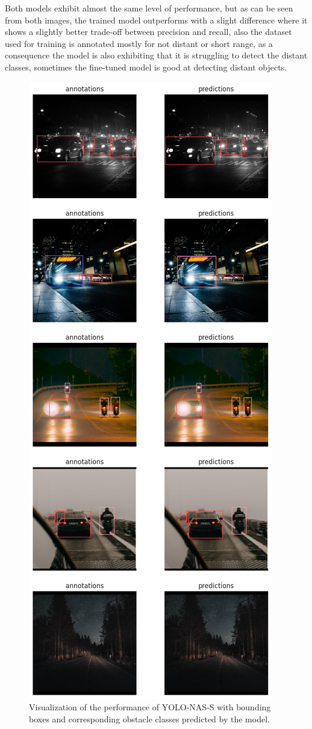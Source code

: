 Both models exhibit almost the same level of performance, but as can be seen from both images, the trained model outperforms with a slight difference where it shows a slightly better trade-off between precision and recall, also the dataset used for training is annotated mostly for not distant or short range, as a consequence the model is also exhibiting that it is struggling to detect the distant classes, sometimes the fine-tuned model is good at detecting distant objects.


 \begin{figure}[H]
    \centering
    \includegraphics[width=0.5\linewidth]{tex/img/YNS2_AP_3.png}
    \caption{Visualization of the performance of YOLO-NAS-S with bounding boxes and corresponding obstacle
classes predicted by the model.}
    \label{fig:S-annot-pred}
\end{figure}

